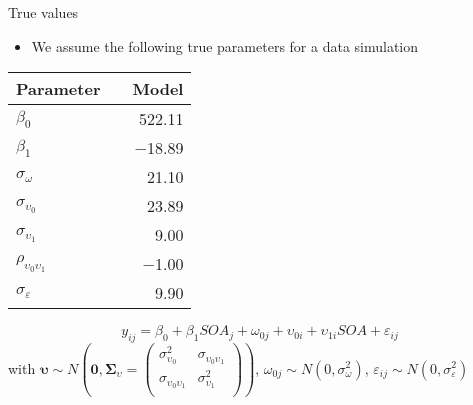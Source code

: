 \documentclass{beamer}
\newcommand{\gvect}[1]{\boldsymbol{#1}}
\newcommand{\gmat}[1]{\boldsymbol{#1}}
\begin{document}
\begin{frame}{True values}
  \begin{itemize}
    \item We assume the following true parameters for a data simulation
  \end{itemize}
  \begin{center}
  \begin{tabular}{lrr}
    \hline
    Parameter && Model \\
    \hline
    $\beta_0$                     && 522.11\\
    $\beta_1$                     && $-$18.89\\
    $\sigma_{\omega}$             && 21.10\\
    $\sigma_{\upsilon_0}$         && 23.89\\
    $\sigma_{\upsilon_1}$         && 9.00\\
    $\rho_{\upsilon_0\upsilon_1}$ && $-$1.00\\
    $\sigma_{\varepsilon}$        && 9.90\\
    \hline
  \end{tabular}
  \end{center}
     \[
       y_{ij} = \beta_0 + \beta_1 SOA_j + \omega_{0j} + \upsilon_{0i} +
       \upsilon_{1i} SOA + \varepsilon_{ij} 
  \]
\small
with $\gvect{\upsilon} \sim N\left(\gvect{0}, \gmat{\Sigma}_{\upsilon} = 
    \begin{pmatrix}
      \sigma^2_{\upsilon_0} & \sigma_{\upsilon_0\upsilon_1} \\
      \sigma_{\upsilon_0\upsilon_1} & \sigma^2_{\upsilon_1} \\
    \end{pmatrix}\right)$,
  $\omega_{0j} \sim N(0, \sigma_{\omega}^2)$, $\varepsilon_{ij} \sim N(0,
  \sigma_{\varepsilon}^2)$ 
\end{frame}
\end{document}

